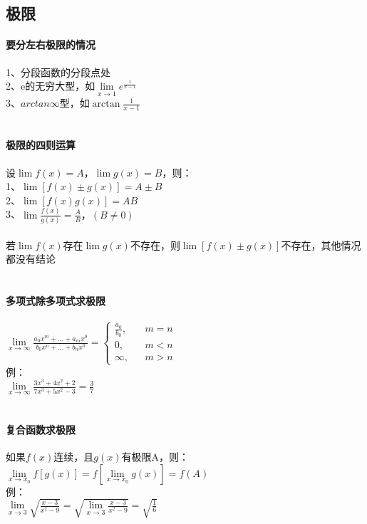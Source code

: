 \documentclass{article}
\begin{document}
\begin{flushleft}
	
	\subsection{极限}
	
	\paragraph{要分左右极限的情况}
	1、分段函数的分段点处\\
	2、e的无穷大型，如$\lim\limits_{x\to 1} e^{\frac{1}{x-1}}$\\
	3、$arctan\infty$型，如$\arctan{\frac{1}{x-1}}$\\
	~\\
	\paragraph{极限的四则运算}
	设$\lim f(x)=A，\lim g(x)=B$，则：\\
	1、$\lim [f(x)\pm g(x)]=A\pm B$\\
	2、$\lim [f(x)g(x)]=AB$\\
	3、$\lim \frac{f(x)}{g(x)} =\frac{A}{B}，(B\neq 0)$\\
	~\\
	若$\lim f(x)$存在$\lim g(x)$不存在，则$\lim [f(x)\pm g(x)]$不存在，其他情况都没有结论\\
	~\\
	\paragraph{多项式除多项式求极限}
	$\lim\limits_{x\to \infty} \frac{a_0x^m+...+a_mx^0}{b_0x^n+...+b_nx^0}=
	\left\{
	\begin{array}{rcl}
	\frac{a_0}{b_0},& & {m=n}\\
	0,& & {m<n}\\
	\infty,& & {m>n}
	\end{array} \right.$\\
	例：\\
	$\lim\limits_{x\to \infty} \frac{3x^3+4x^2+2}{7x^3+5x^2-3} = \frac{3}{7}$\\
	~\\
	\paragraph{复合函数求极限}
	如果$f(x)$连续，且$g(x)$有极限A，则：\\
	$\lim\limits_{x\to x_0} f[g(x)]=f[\lim\limits_{x\to x_0}g(x)]=f(A)$\\
	例：\\
	$\lim\limits_{x\to 3} \sqrt{\frac{x-3}{x^2-9}}= \sqrt{\lim\limits_{x\to 3} \frac{x-3}{x^2-9}}=\sqrt{\frac{1}{6}}$\\
	~\\

\end{flushleft}
\end{document}
